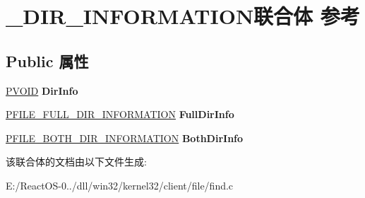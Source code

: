 \hypertarget{union___d_i_r___i_n_f_o_r_m_a_t_i_o_n}{}\section{\+\_\+\+D\+I\+R\+\_\+\+I\+N\+F\+O\+R\+M\+A\+T\+I\+O\+N联合体 参考}
\label{union___d_i_r___i_n_f_o_r_m_a_t_i_o_n}
\subsection*{Public 属性}
\begin{DoxyCompactItemize}
\item 
\mbox{\label{union___d_i_r___i_n_f_o_r_m_a_t_i_o_n_a00a9e6353ad9fb8e8e68164d8ef746c1}} 
\hyperlink{interfacevoid}{P\+V\+O\+ID} {\bfseries Dir\+Info}
\item 
\mbox{\label{union___d_i_r___i_n_f_o_r_m_a_t_i_o_n_a999709121f52db1ab64eae9cdd098554}} 
\hyperlink{struct___f_i_l_e___f_u_l_l___d_i_r_e_c_t_o_r_y___i_n_f_o_r_m_a_t_i_o_n}{P\+F\+I\+L\+E\+\_\+\+F\+U\+L\+L\+\_\+\+D\+I\+R\+\_\+\+I\+N\+F\+O\+R\+M\+A\+T\+I\+ON} {\bfseries Full\+Dir\+Info}
\item 
\mbox{\label{union___d_i_r___i_n_f_o_r_m_a_t_i_o_n_af33abdcb9e760f0aa6094fa5a19ffb5a}} 
\hyperlink{struct___f_i_l_e___b_o_t_h___d_i_r___i_n_f_o_r_m_a_t_i_o_n}{P\+F\+I\+L\+E\+\_\+\+B\+O\+T\+H\+\_\+\+D\+I\+R\+\_\+\+I\+N\+F\+O\+R\+M\+A\+T\+I\+ON} {\bfseries Both\+Dir\+Info}
\end{DoxyCompactItemize}


该联合体的文档由以下文件生成\+:\begin{DoxyCompactItemize}
\item 
E\+:/\+React\+O\+S-\/0../dll/win32/kernel32/client/file/find.\+c\end{DoxyCompactItemize}
